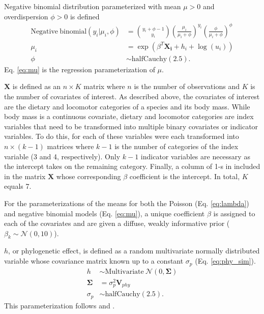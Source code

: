 \documentclass[12pt,letterpaper]{article}
\begin{document}
Negative binomial distribution parameterized with mean \(\mu > 0\) and overdispersion \(\phi > 0\) is defined
\begin{align}
  \mathrm{Negative\ binomial}(y_{i} | \mu_{i}, \phi) &= {y_{i} + \phi -1 \choose y_{i}} \left(\frac{\mu_{i}}{\mu_{i} + \phi}\right)^{y_{i}} \left(\frac{\phi}{\mu_{i} + \phi}\right)^{\phi}
  \label{eq:neg_bin} \\
  \mu_{i} &= \exp(\beta^{T}\mathbf{X_{i}} + h_{i} + \log(u_{i})) 
  \label{eq:mu} \\
  \phi &\sim \mathrm{halfCauchy}(2.5).
  \label{eq:phi} 
\end{align}
Eq. \ref{eq:mu} is the regression parameterization of \(\mu\).


\(\mathbf{X}\) is defined as an \(n \times K\) matrix where \(n\) is the number of observations and \(K\) is the number of covariates of interest. As described above, the covariates of interest are the dietary and locomotor categories of a species and its body mass. While body mass is a continuous covariate, dietary and locomotor categories are index variables that need to be transformed into multiple binary covariates or indicator variables. To do this, for each of these variables were each transformed into \(n \times (k - 1)\) matrices where \(k - 1\) is the number of categories of the index variable (3 and 4, respectively). Only \(k - 1\) indicator variables are necessary as the intercept takes on the remaining category. Finally, a column of 1-s in included in the matrix \(\mathbf{X}\) whose corresponding \(\beta\) coefficient is the intercept. In total, \(K\) equals 7.

For the parameterizations of the means for both the Poisson (Eq. \ref{eq:lambda}) and negative binomial models (Eq. \ref{eq:mu}), a unique coefficient \(\beta\) is assigned to each of the covariates and are given a diffuse, weakly informative prior (\(\beta_{k} \sim \mathcal{N}(0, 10)\)).

\(h\), or phylogenetic effect, is defined as a random multivariate normally distributed variable whose covariance matrix known up to a constant \(\sigma_{p}\) (Eq. \ref{eq:phy_sim}).
\begin{align}
  h &\sim \mathrm{Multivariate\ }\mathcal{N}(0, \mathbf{\Sigma}) \label{eq:phy_sim} \\
  \mathbf{\Sigma} &= \sigma_{p}^{2} \mathbf{V}_{phy} \nonumber \\
  \sigma_{p} &\sim \mathrm{halfCauchy}(2.5). \nonumber
\end{align}
This parameterization follows \citet{Lynch1991} and \citet{Housworth2004}.
\end{document}
